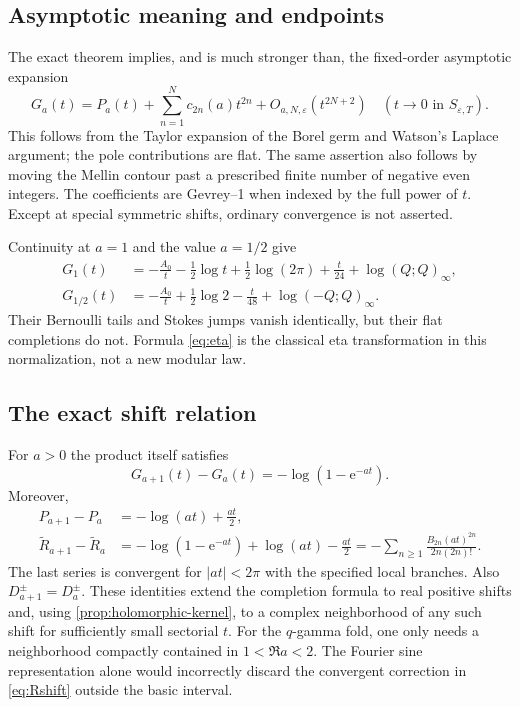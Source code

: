 \documentclass[11pt,a4paper]{article}
\numberwithin{equation}{section}
\theoremstyle{definition}
\theoremstyle{remark}
\newcommand{\e}{\mathrm e}
\newcommand{\eps}{\varepsilon}
\newcommand{\wt}{\widetilde}
\begin{document}
\subsection{Asymptotic meaning and endpoints}
The exact theorem implies, and is much stronger than, the fixed-order
asymptotic expansion
\begin{equation}
 G_a(t)=P_a(t)+\sum_{n=1}^{N}c_{2n}(a)t^{2n}+O_{a,N,\eps}(t^{2N+2})
 \quad(t\to0\text{ in }S_{\eps,T}).
 \label{eq:fixedorder}
\end{equation}
This follows from the Taylor expansion of the Borel germ and Watson's
Laplace argument; the pole contributions are flat. The same assertion
also follows by moving the Mellin contour past a prescribed finite
number of negative even integers. The coefficients are Gevrey--1 when
indexed by the full power of $t$. Except at special symmetric shifts,
ordinary convergence is not asserted.

Continuity at $a=1$ and the value $a=1/2$ give
\begin{align}
 G_1(t)&=-\frac{A_0}{t}-\frac12\log t+\frac12\log(2\pi)+\frac t{24}
         +\log(Q;Q)_\infty,
 \label{eq:eta}\\
 G_{1/2}(t)&=-\frac{A_0}{t}+\frac12\log2-\frac t{48}
         +\log(-Q;Q)_\infty.
 \label{eq:half}
\end{align}
Their Bernoulli tails and Stokes jumps vanish identically, but their
flat completions do not. Formula \eqref{eq:eta} is the classical eta
transformation in this normalization, not a new modular law.

\subsection{The exact shift relation}
For $a>0$ the product itself satisfies
\begin{equation}
 G_{a+1}(t)-G_a(t)=-\log(1-\e^{-at}).
 \label{eq:Gshift}
\end{equation}
Moreover,
\begin{align}
 P_{a+1}-P_a&=-\log(at)+\frac{at}{2},\label{eq:Pshift}\\
 \wt R_{a+1}-\wt R_a
 &=-\log(1-\e^{-at})+\log(at)-\frac{at}{2}
 =-\sum_{n\geq1}\frac{B_{2n}(at)^{2n}}{2n(2n)!}.
 \label{eq:Rshift}
\end{align}
The last series is convergent for $|at|<2\pi$ with the specified local
branches. Also $D_{a+1}^\pm=D_a^\pm$. These identities extend the
completion formula to real positive shifts and, using
\cref{prop:holomorphic-kernel}, to a complex neighborhood of any such
shift for sufficiently small sectorial $t$. For the $q$-gamma fold,
one only needs a neighborhood compactly contained in $1<\Re a<2$.
The Fourier sine representation alone would incorrectly discard the
convergent correction in \eqref{eq:Rshift} outside the basic interval.
\end{document}
